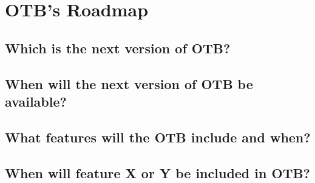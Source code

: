 \documentclass[english]{article}
\begin{document}
\section{OTB's Roadmap}
\subsection{Which is the next version of OTB?}
\subsection{When will the next version of OTB be available?}
\subsection{What features will the OTB include and when?}
\subsection{When will feature X or Y be included in OTB?}


%

%
\end{document}

